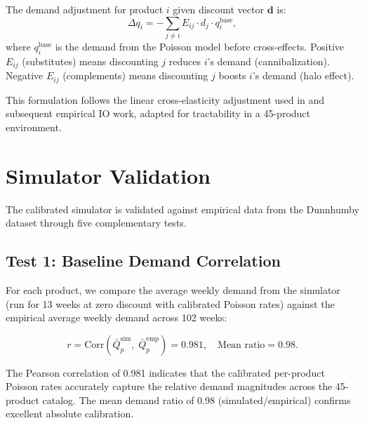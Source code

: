 \documentclass[11pt,a4paper]{article}
\begin{document}
The demand adjustment for product $i$ given discount vector $\mathbf{d}$ is:
\begin{equation}
\Delta q_i = -\sum_{j \neq i} E_{ij} \cdot d_j \cdot q_i^{\text{base}},
\end{equation}
where $q_i^{\text{base}}$ is the demand from the Poisson model before cross-effects.
Positive $E_{ij}$ (substitutes) means discounting $j$ reduces $i$'s demand (cannibalization).
Negative $E_{ij}$ (complements) means discounting $j$ boosts $i$'s demand (halo effect).

This formulation follows the linear cross-elasticity adjustment used in \citet{blp1995} and subsequent empirical IO work, adapted for tractability in a 45-product environment.

\section{Simulator Validation}
\label{sec:validation}

The calibrated simulator is validated against empirical data from the Dunnhumby dataset through five complementary tests.

\subsection{Test 1: Baseline Demand Correlation}

For each product, we compare the average weekly demand from the simulator (run for 13 weeks at zero discount with calibrated Poisson rates) against the empirical average weekly demand across 102 weeks:

\begin{equation}
r = \text{Corr}\!\left(\bar{Q}_p^{\text{sim}},\;\bar{Q}_p^{\text{emp}}\right) = 0.981, \quad \text{Mean ratio} = 0.98.
\end{equation}

The Pearson correlation of 0.981 indicates that the calibrated per-product Poisson rates accurately capture the relative demand magnitudes across the 45-product catalog.
The mean demand ratio of 0.98 (simulated/empirical) confirms excellent absolute calibration.

\end{document}

